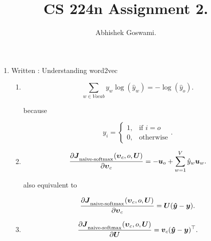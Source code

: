 \documentclass[]{article}
\begin{document}
\title{CS 224n Assignment 2.}
\author{Abhishek Goswami.}
\maketitle

\begin{enumerate}
	\item Written : Understanding word2vec
	
	\begin{enumerate}
		
		\item
		\begin{equation}
		\sum_{w \in Vocab} y_w \log(\hat{y}_w) = - \log(\hat{y}_o).
		\end{equation}

		because
		
		\begin{equation}
		y_{i} = 
\begin{cases}
    1, & \text{if } i = o\\
    0, & \text{otherwise}
\end{cases}.
		\end{equation}
			
		\item
		\begin{equation}
		\frac{\partial 		\boldsymbol{J}_\textsubscript{naive-softmax}(\boldsymbol{\upsilon}_c, o, \boldsymbol{U})}{\partial \boldsymbol{\upsilon}_c} = 
		- \boldsymbol{u}_{o} + \sum_{w=1}^V \hat{y}_w \boldsymbol{u}_{w}.
		\end{equation}

		also equivalent to 
		
		\begin{equation}
		\frac{\partial 		\boldsymbol{J}_\textsubscript{naive-softmax}(\boldsymbol{\upsilon}_c, o, \boldsymbol{U})}{\partial \boldsymbol{\upsilon}_c} = 
		\boldsymbol{U} (\boldsymbol{\hat{y}} - \boldsymbol{y}).
		\end{equation}
		
		\item
		\begin{equation}
		\frac{\partial 		\boldsymbol{J}_\textsubscript{naive-softmax}(\boldsymbol{\upsilon}_c, o, \boldsymbol{U})}{\partial \boldsymbol{U}} = 
		\boldsymbol{v}_{c} (\boldsymbol{\hat{y}} - \boldsymbol{y})^\top.
		\end{equation}
			

\end{enumerate}
\end{enumerate}
\end{document}
